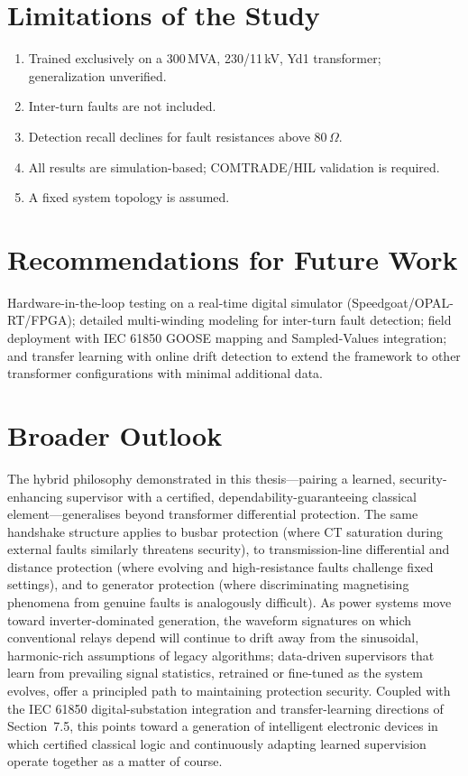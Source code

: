 \documentclass[12pt,a4paper,oneside]{report}
\begin{document}
\section{Limitations of the Study}
\begin{enumerate}[leftmargin=1.6em,itemsep=2pt]
\item Trained exclusively on a 300\,MVA, 230/11\,kV, Yd1 transformer; generalization unverified.
\item Inter-turn faults are not included.
\item Detection recall declines for fault resistances above 80\,$\Omega$.
\item All results are simulation-based; COMTRADE/HIL validation is required.
\item A fixed system topology is assumed.
\end{enumerate}

\section{Recommendations for Future Work}
Hardware-in-the-loop testing on a real-time digital simulator (Speedgoat/OPAL-RT/FPGA); detailed multi-winding modeling for inter-turn fault detection; field deployment with IEC 61850 GOOSE mapping and Sampled-Values integration; and transfer learning with online drift detection to extend the framework to other transformer configurations with minimal additional data.

\section{Broader Outlook}
The hybrid philosophy demonstrated in this thesis---pairing a learned, security-enhancing supervisor with a certified, dependability-guaranteeing classical element---generalises beyond transformer differential protection. The same handshake structure applies to busbar protection (where CT saturation during external faults similarly threatens security), to transmission-line differential and distance protection (where evolving and high-resistance faults challenge fixed settings), and to generator protection (where discriminating magnetising phenomena from genuine faults is analogously difficult). As power systems move toward inverter-dominated generation, the waveform signatures on which conventional relays depend will continue to drift away from the sinusoidal, harmonic-rich assumptions of legacy algorithms; data-driven supervisors that learn from prevailing signal statistics, retrained or fine-tuned as the system evolves, offer a principled path to maintaining protection security. Coupled with the IEC 61850 digital-substation integration and transfer-learning directions of Section~7.5, this points toward a generation of intelligent electronic devices in which certified classical logic and continuously adapting learned supervision operate together as a matter of course.
\end{document}
